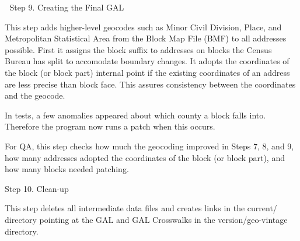                                                  Step 9. Creating the Final GAL

This step adds higher-level geocodes such as Minor Civil Division, Place, and Metropolitan Statistical
Area from the Block Map File (BMF) to all addresses possible. First it assigns the block suffix to
addresses on blocks the Census Bureau has split to accomodate boundary changes. It adopts the
coordinates of the block (or block part) internal point if the existing coordinates of an address are less
precise than block face. This assures consistency between the coordinates and the geocode. 

In tests, a few anomalies appeared about which county a block falls into. Therefore the program now runs
a patch when this occurs. 

For QA, this step checks how much the geocoding improved in Steps 7, 8, and 9, how many addresses
adopted the coordinates of the block (or block part), and how many blocks needed patching.
                                
                       Step 10. Clean-up

This step deletes all intermediate data files and creates links in the current/ directory pointing at the GAL
and GAL Crosswalks in the version/geo-vintage directory.

